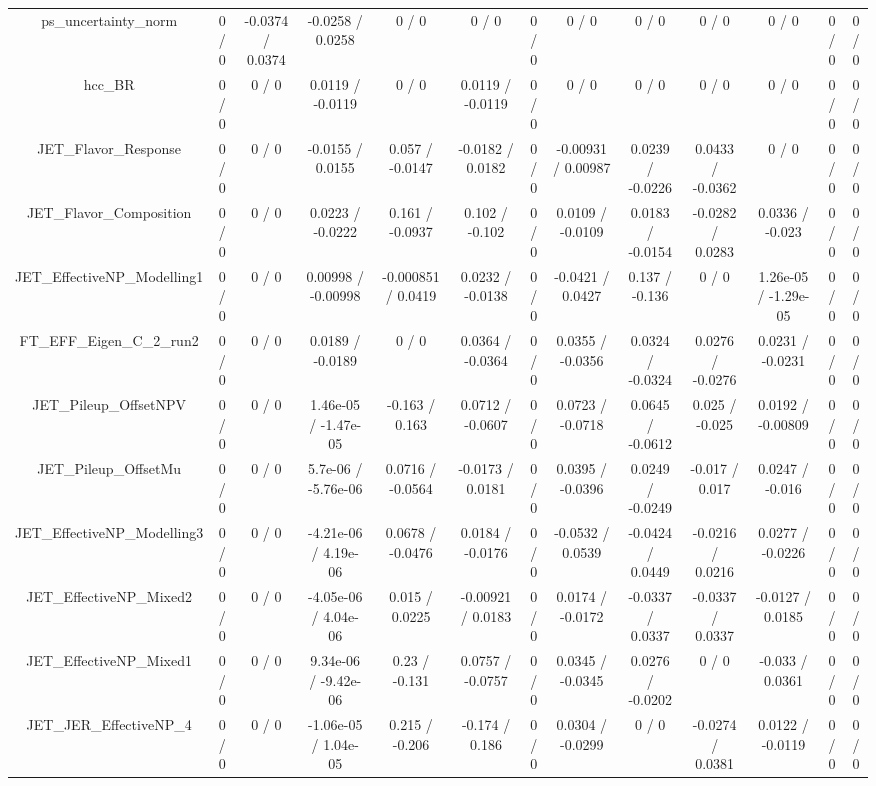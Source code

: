 \documentclass[10pt]{article}
\begin{document}
\begin{table}[htbp]
\begin{center}
\begin{tabular}{|c|c|c|c|c|c|c|c|c|c|c|c|c|}
  ps_uncertainty_norm & 0 / 0 & -0.0374 / 0.0374 & -0.0258 / 0.0258 & 0 / 0 & 0 / 0 & 0 / 0 & 0 / 0 & 0 / 0 & 0 / 0 & 0 / 0 & 0 / 0 & 0 / 0 \\ 
  hcc_BR & 0 / 0 & 0 / 0 & 0.0119 / -0.0119 & 0 / 0 & 0.0119 / -0.0119 & 0 / 0 & 0 / 0 & 0 / 0 & 0 / 0 & 0 / 0 & 0 / 0 & 0 / 0 \\ 
  JET_Flavor_Response & 0 / 0 & 0 / 0 & -0.0155 / 0.0155 & 0.057 / -0.0147 & -0.0182 / 0.0182 & 0 / 0 & -0.00931 / 0.00987 & 0.0239 / -0.0226 & 0.0433 / -0.0362 & 0 / 0 & 0 / 0 & 0 / 0 \\ 
  JET_Flavor_Composition & 0 / 0 & 0 / 0 & 0.0223 / -0.0222 & 0.161 / -0.0937 & 0.102 / -0.102 & 0 / 0 & 0.0109 / -0.0109 & 0.0183 / -0.0154 & -0.0282 / 0.0283 & 0.0336 / -0.023 & 0 / 0 & 0 / 0 \\ 
  JET_EffectiveNP_Modelling1 & 0 / 0 & 0 / 0 & 0.00998 / -0.00998 & -0.000851 / 0.0419 & 0.0232 / -0.0138 & 0 / 0 & -0.0421 / 0.0427 & 0.137 / -0.136 & 0 / 0 & 1.26e-05 / -1.29e-05 & 0 / 0 & 0 / 0 \\ 
  FT_EFF_Eigen_C_2_run2 & 0 / 0 & 0 / 0 & 0.0189 / -0.0189 & 0 / 0 & 0.0364 / -0.0364 & 0 / 0 & 0.0355 / -0.0356 & 0.0324 / -0.0324 & 0.0276 / -0.0276 & 0.0231 / -0.0231 & 0 / 0 & 0 / 0 \\ 
  JET_Pileup_OffsetNPV & 0 / 0 & 0 / 0 & 1.46e-05 / -1.47e-05 & -0.163 / 0.163 & 0.0712 / -0.0607 & 0 / 0 & 0.0723 / -0.0718 & 0.0645 / -0.0612 & 0.025 / -0.025 & 0.0192 / -0.00809 & 0 / 0 & 0 / 0 \\ 
  JET_Pileup_OffsetMu & 0 / 0 & 0 / 0 & 5.7e-06 / -5.76e-06 & 0.0716 / -0.0564 & -0.0173 / 0.0181 & 0 / 0 & 0.0395 / -0.0396 & 0.0249 / -0.0249 & -0.017 / 0.017 & 0.0247 / -0.016 & 0 / 0 & 0 / 0 \\ 
  JET_EffectiveNP_Modelling3 & 0 / 0 & 0 / 0 & -4.21e-06 / 4.19e-06 & 0.0678 / -0.0476 & 0.0184 / -0.0176 & 0 / 0 & -0.0532 / 0.0539 & -0.0424 / 0.0449 & -0.0216 / 0.0216 & 0.0277 / -0.0226 & 0 / 0 & 0 / 0 \\ 
  JET_EffectiveNP_Mixed2 & 0 / 0 & 0 / 0 & -4.05e-06 / 4.04e-06 & 0.015 / 0.0225 & -0.00921 / 0.0183 & 0 / 0 & 0.0174 / -0.0172 & -0.0337 / 0.0337 & -0.0337 / 0.0337 & -0.0127 / 0.0185 & 0 / 0 & 0 / 0 \\ 
  JET_EffectiveNP_Mixed1 & 0 / 0 & 0 / 0 & 9.34e-06 / -9.42e-06 & 0.23 / -0.131 & 0.0757 / -0.0757 & 0 / 0 & 0.0345 / -0.0345 & 0.0276 / -0.0202 & 0 / 0 & -0.033 / 0.0361 & 0 / 0 & 0 / 0 \\ 
  JET_JER_EffectiveNP_4 & 0 / 0 & 0 / 0 & -1.06e-05 / 1.04e-05 & 0.215 / -0.206 & -0.174 / 0.186 & 0 / 0 & 0.0304 / -0.0299 & 0 / 0 & -0.0274 / 0.0381 & 0.0122 / -0.0119 & 0 / 0 & 0 / 0 \\ 

\end{tabular}
\end{center}
\end{table}
\end{document}
